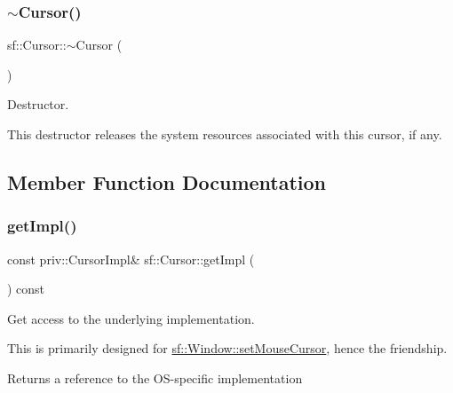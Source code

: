 \subsubsection{\texorpdfstring{$\sim$Cursor()}{~Cursor()}}
{\footnotesize\ttfamily sf\+::\+Cursor\+::$\sim$\+Cursor (\begin{DoxyParamCaption}{ }\end{DoxyParamCaption})}



Destructor. 

This destructor releases the system resources associated with this cursor, if any. \begin{DoxyVerb}\end{DoxyVerb}
 

\subsection{Member Function Documentation}
\mbox{\label{classsf_1_1_cursor_aa4795e3565ac3aabd4b078ededaede4d}} 
\subsubsection{\texorpdfstring{getImpl()}{getImpl()}}
{\footnotesize\ttfamily const priv\+::\+Cursor\+Impl\& sf\+::\+Cursor\+::get\+Impl (\begin{DoxyParamCaption}{ }\end{DoxyParamCaption}) const\hspace{0.3cm}{\ttfamily [private]}}



Get access to the underlying implementation. 

This is primarily designed for \mbox{\hyperlink{classsf_1_1_window_aab7a05baece72b08ad120063b143d19b}{sf\+::\+Window\+::set\+Mouse\+Cursor}}, hence the friendship.

\begin{DoxyReturn}{Returns}
a reference to the O\+S-\/specific implementation \begin{DoxyVerb}\end{DoxyVerb}
 
\end{DoxyReturn}
\mbox{\label{classsf_1_1_cursor_ac24ecf82ac7d9ba6703389397f948b3a}} 
